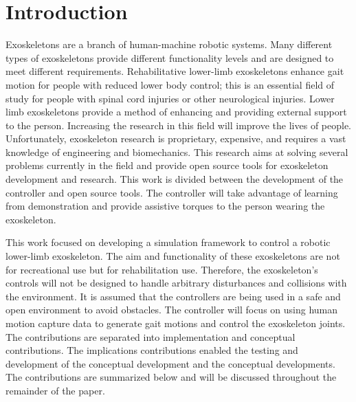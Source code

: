 \chapter{Introduction}

Exoskeletons are a branch of human-machine robotic systems. Many different types of exoskeletons provide different functionality levels and are designed to meet different requirements. Rehabilitative lower-limb exoskeletons enhance gait motion for people with reduced lower body control; this is an essential field of study for people with spinal cord injuries or other neurological injuries. Lower limb exoskeletons provide a method of enhancing and providing external support to the person. Increasing the research in this field will improve the lives of people. Unfortunately, exoskeleton research is proprietary, expensive, and requires a vast knowledge of engineering and biomechanics. This research aims at solving several problems currently in the field and provide open source tools for exoskeleton development and research. This work is divided between the development of the controller and open source tools. The controller will take advantage of learning from demonstration and provide assistive torques to the person wearing the exoskeleton.


This work focused on developing a simulation framework to control a robotic lower-limb exoskeleton. The aim and functionality of these exoskeletons are not for recreational use but for rehabilitation use. Therefore, the exoskeleton's controls will not be designed to handle arbitrary disturbances and collisions with the environment. It is assumed that the controllers are being used in a safe and open environment to avoid obstacles. The controller will focus on using human motion capture data to generate gait motions and control the exoskeleton joints. The contributions are separated into implementation and conceptual contributions. The implications contributions enabled the testing and development of the conceptual development and the conceptual developments. The contributions are summarized below and will be discussed throughout the remainder of the paper. 


